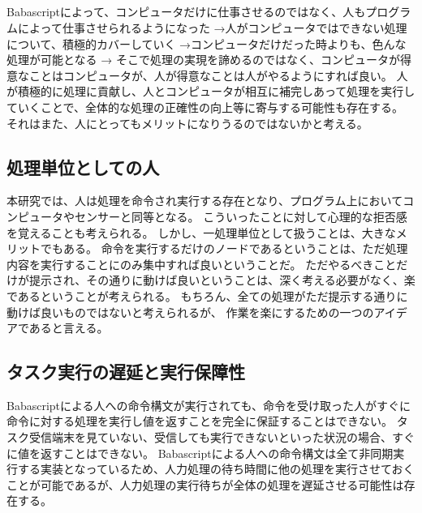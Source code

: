 \documentclass[twoside]{wiss}
\begin{document}
\subsection{}



Babascriptによって、コンピュータだけに仕事させるのではなく、人もプログラムによって仕事させられるようになった
→人がコンピュータではできない処理について、積極的カバーしていく
→コンピュータだけだった時よりも、色んな処理が可能となる
→
そこで処理の実現を諦めるのではなく、コンピュータが得意なことはコンピュータが、人が得意なことは人がやるようにすれば良い。
人が積極的に処理に貢献し、人とコンピュータが相互に補完しあって処理を実行していくことで、全体的な処理の正確性の向上等に寄与する可能性も存在する。
それはまた、人にとってもメリットになりうるのではないかと考える。

\subsection{処理単位としての人}

本研究では、人は処理を命令され実行する存在となり、プログラム上においてコンピュータやセンサーと同等となる。
こういったことに対して心理的な拒否感を覚えることも考えられる。
しかし、一処理単位として扱うことは、大きなメリットでもある。
命令を実行するだけのノードであるということは、ただ処理内容を実行することにのみ集中すれば良いということだ。
ただやるべきことだけが提示され、その通りに動けば良いということは、深く考える必要がなく、楽であるということが考えられる。
もちろん、全ての処理がただ提示する通りに動けば良いものではないと考えられるが、
作業を楽にするための一つのアイデアであると言える。

\subsection{タスク実行の遅延と実行保障性}

Babascriptによる人への命令構文が実行されても、命令を受け取った人がすぐに命令に対する処理を実行し値を返すことを完全に保証することはできない。
タスク受信端末を見ていない、受信しても実行できないといった状況の場合、すぐに値を返すことはできない。
Babascriptによる人への命令構文は全て非同期実行する実装となっているため、人力処理の待ち時間に他の処理を実行させておくことが可能であるが、人力処理の実行待ちが全体の処理を遅延させる可能性は存在する。
\end{document}
